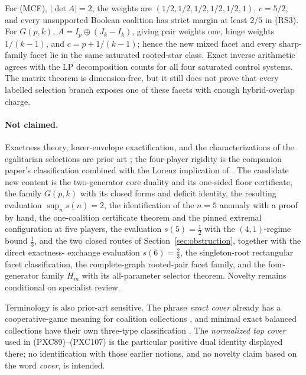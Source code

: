 \documentclass[11pt]{article}
\begin{document}
For (MCF), $|\det A|=2$, the weights are
$(1/2,1/2,1/2,1/2,1/2,1)$, $c=5/2$, and every unsupported
Boolean coalition has strict margin at least $2/5$ in (RS3).  For
$G(p,k)$, $A=I_p\oplus(J_k-I_k)$, giving pair weights one, hinge weights
$1/(k-1)$, and $c=p+1/(k-1)$; hence the new mixed facet and every sharp-family
facet lie in the same saturated rooted-star class.  Exact inverse arithmetic
agrees with the LP decomposition counts for all four saturated control
systems.  The matrix theorem is dimension-free, but it still does not prove
that every labelled selection branch exposes one of these facets with enough
hybrid-overlap charge.

\paragraph{Not claimed.}
Exactness theory, lower-envelope exactification, and the characterizations of
the egalitarian selections are prior art
\citep{ArinInarra2001,ArinKuipersVermeulen2003,ArinEtAl2008,Biswas1999,
Dietzenbacher2021,DietzenbacherYanovskaya2020,LlerenaMauri2017,
CsokaHeringsKoczy2011,FrankMurota2022,KroupaStudeny2019,
StudenyKratochvil2022,GongDietzenbacherPeters2022,
GongDietzenbacher2026,LohmannBormHerings2012,ReijnierseDerks1998}; the
four-player rigidity is the companion paper's classification
\citep{Flanagan2026} combined with the Lorenz implication of
\citet{LlerenaMauri2017}.  The candidate
new content is the two-generator core duality and its one-sided
floor certificate, the family $G(p,k)$ with its closed forms and deficit
identity, the resulting evaluation $\sup_n s(n)=2$, the identification of the
$n=5$ anomaly with a proof by hand, the one-coalition certificate theorem
and the pinned extremal configuration at five players, the evaluation
$s(5)=\tfrac12$ with the $(4,1)$-regime bound $\tfrac13$, and the two closed
routes of Section~\ref{sec:obstruction}, together with the direct exactness-
exchange evaluation $s(6)=\tfrac23$, the singleton-root rectangular facet
classification, the complete-graph rooted-pair facet family, and the
four-generator family \(H_m\) with its all-parameter selector theorem.  Novelty
remains conditional on specialist review.

Terminology is also prior-art sensitive.  The phrase \emph{exact cover}
already has a cooperative-game meaning for coalition collections
\citep{ReijnierseDerks1998}, and minimal exact balanced collections have their
own three-type classification \citep{LohmannBormHerings2012}.  The
\emph{normalized top cover} used in (PXC89)--(PXC107) is the particular
positive dual identity displayed there; no identification with those earlier
notions, and no novelty claim based on the word \emph{cover}, is intended.
\end{document}
